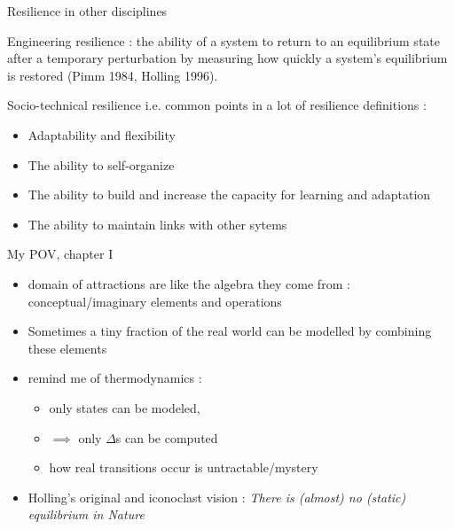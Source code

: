 \documentclass[11,aspectratio=1610]{beamer}
\begin{document}
\begin{frame}{Resilience in other disciplines}

\begin{small}
\alert{Engineering resilience} :   the ability of a system to return to an equilibrium state after a temporary perturbation by measuring how quickly a system’s equilibrium is restored (Pimm 1984, Holling 1996).

\vfill

\alert{Socio-technical resilience}  i.e. common points in a lot of resilience definitions : 
\begin{itemize}
  \item  \alert{Adaptability} and flexibility 
  \item  The ability to \alert{self-organize}
  \item  The ability to build and increase the capacity for \alert{learning and adaptation}
  \item  The ability to maintain \alert{links}  with other sytems 
  \end{itemize}
\end{small}


\end{frame}



\begin{frame}{My POV, chapter I}

\begin{itemize}
\item  domain of attractions are like the algebra they come from  : conceptual/imaginary elements and operations 
\item  Sometimes a tiny fraction of the real world can be modelled by combining these elements
\item  remind me of thermodynamics : 
\begin{itemize}
  \item  only states can be modeled,  
  \item  $\implies$ only $\Delta$s can be computed
  \item  how real transitions occur is untractable/mystery 
  \end{itemize}
\item  Holling's original and iconoclast vision : \alert{\textit{There is (almost) no (static) equilibrium in Nature}}
\end{itemize}


\end{frame}
\end{document}
